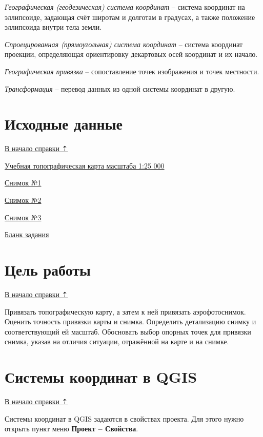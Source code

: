\documentclass[
  12pt,
]{book}
\begin{document}
\emph{Географическая (геодезическая) система координат} -- система координат на эллипсоиде, задающая счёт широтам и долготам в градусах, а также положение эллипсоида внутри тела земли.

\emph{Спроецированная (прямоугольная) система координат} -- система координат проекции, определяющая ориентировку декартовых осей координат и их начало.

\emph{Географическая привязка} -- сопоставление точек изображения и точек местности.

\emph{Трансформация} -- перевод данных из одной системы координат в другую.

\section{Исходные данные}\label{georeference-data}

\hyperref[georeference]{В начало справки ⇡}

\href{https://yadi.sk/i/mvQ3lJJVNVJiuA}{Учебная топографическая карта масштаба 1:25 000}

\href{https://yadi.sk/i/Zo4U3AuslrxwAg}{Снимок №1}

\href{https://yadi.sk/i/_Yl8PMShZ-7FIw}{Снимок №2}

\href{https://yadi.sk/i/JKSSi97_dbu7Lg}{Снимок №3}

\href{https://yadi.sk/i/WDWZgCLA2A539Q}{Бланк задания}

\section{Цель работы}\label{georeference-task}

\hyperref[georeference]{В начало справки ⇡}

Привязать топографическую карту, а затем к ней привязать аэрофотоснимок. Оценить точность привязки карты и снимка. Определить детализацию снимку и соответствующий ей масштаб. Обосновать выбор опорных точек для привязки снимка, указав на отличия ситуации, отражённой на карте и на снимке.

\section{Системы координат в QGIS}\label{coordinate-systems}

\hyperref[georeference]{В начало справки ⇡}

Системы координат в QGIS задаются в свойствах проекта. Для этого нужно открыть пункт меню \textbf{Проект -- Свойства}.
\end{document}

